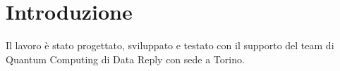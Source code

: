 \chapter{Introduzione}
\label{sec:intro}









Il lavoro è stato progettato, sviluppato e testato con il supporto del team di Quantum Computing di Data Reply con sede a Torino. 


